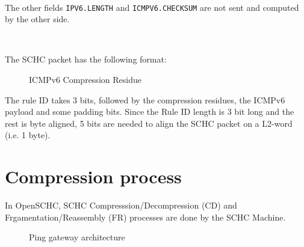 ~~

The other fields \texttt{IPV6.LENGTH} and \texttt{ICMPV6.CHECKSUM} are not sent and computed by the other side.

~~

The SCHC packet has the following format:

\begin{figure}[!ht] 
\centering 

\caption{ICMPv6 Compression Residue} 
\label{fig-residue} 
\end{figure} 

The rule ID takes 3 bits, followed by the compression residues, the ICMPv6 payload and some padding bits. Since the Rule ID length is 3 bit long and the rest is byte aligned, 5 bits are needed to align the SCHC packet on a  L2-word (i.e. 1 byte).

\section {Compression process}

In OpenSCHC, SCHC Compresssion/Decompression (CD) and Frgamentation/Reassembly (FR) processes are done by the SCHC Machine.

\begin{figure}[!ht] 
\centering 



\caption{Ping gateway architecture} 
\label{fig-schc-archi} 
\end{figure} 

